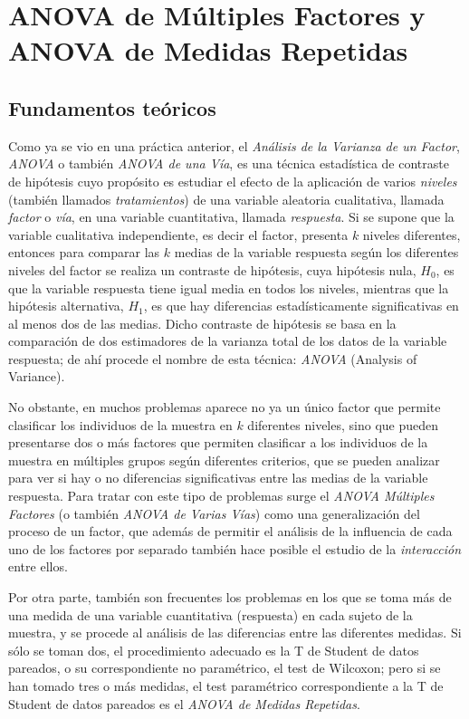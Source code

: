 
\chapter[ANOVA de múltiples factores y medidas repetidas]{ANOVA de Múltiples Factores y ANOVA de Medidas Repetidas}

\medskip
\section{Fundamentos teóricos}
Como ya se vio en una práctica anterior, el \emph{Análisis de la Varianza de un Factor}, \emph{ANOVA} o también
\emph{ANOVA de una Vía}, es una técnica estadística de contraste de hipótesis cuyo propósito es estudiar el efecto de la
aplicación de varios \emph{niveles} (también llamados \emph{tratamientos}) de una variable aleatoria cualitativa,
llamada \emph{factor} o \emph{vía}, en una variable cuantitativa, llamada \emph{respuesta}.
Si se supone que la variable cualitativa independiente, es decir el factor, presenta $k$ niveles diferentes, entonces
para comparar las $k$ medias de la variable respuesta según los diferentes niveles del factor se realiza un contraste de
hipótesis, cuya hipótesis nula, $H_0$, es que la variable respuesta tiene igual media en todos los niveles, mientras que
la hipótesis alternativa, $H_1$, es que hay diferencias estadísticamente significativas en al menos dos de las medias.
 Dicho contraste de
hipótesis se basa en la comparación de dos estimadores de la varianza total de los datos de la variable respuesta; de
ahí procede el nombre de esta técnica: \emph{ANOVA} (Analysis of Variance).

No obstante, en muchos problemas aparece no ya un único factor que permite clasificar los individuos de la muestra en
$k$ diferentes niveles, sino que pueden presentarse dos o más factores que permiten clasificar a los individuos de la
muestra en múltiples grupos según diferentes criterios, que se pueden analizar para ver si hay o no diferencias
significativas entre las medias de la variable respuesta.
Para tratar con este tipo de problemas surge el \emph{ANOVA Múltiples Factores} (o también \emph{ANOVA de Varias Vías})
como una generalización del proceso de un factor, que además de permitir el análisis de la influencia de cada uno de los
factores por separado también hace posible el estudio de la \emph{interacción} entre ellos.

Por otra parte, también son frecuentes los problemas en los que se toma más de una medida de una variable cuantitativa
(respuesta) en cada sujeto de la muestra, y se procede al análisis de las diferencias entre las diferentes medidas.
Si sólo se toman dos, el procedimiento adecuado es la T de Student de datos pareados, o su correspondiente no
paramétrico, el test de Wilcoxon; pero si se han tomado tres o más medidas, el test paramétrico correspondiente a la T
de Student de datos pareados es el \emph{ANOVA de Medidas Repetidas}.

